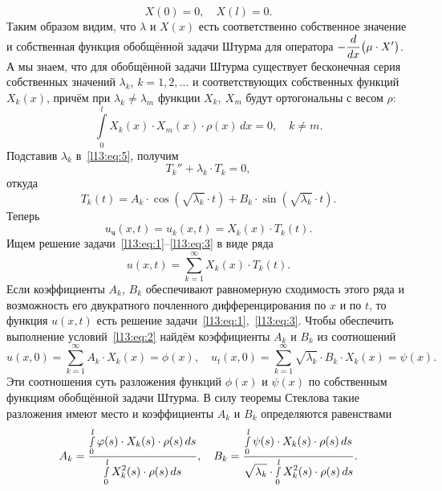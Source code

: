 \begin{equation}\label{l13:eq:7}
	 X(0)=0,\quad X(l)=0.
\end{equation}
Таким образом видим, что $\lambda$ и $X(x)$ есть соответственно собственное значение и собственная функция обобщённой задачи Штурма для оператора $\displaystyle-\der{}{x}\big(\mu\cdot X'\big)$. А мы знаем, что для обобщённой задачи Штурма существует бесконечная серия собственных значений $\lambda_k$, $k=1,2,\ldots$ и соответствующих собственных функций $X_k(x)$, причём при $\lambda_k\neq\lambda_m$ функции $X_k,\ X_m$ будут ортогональны с весом $\rho$:
\begin{equation*}
	\int\limits_0^l X_k(x)\cdot X_m(x)\cdot\rho(x)\,dx=0,\quad k\neq m.
\end{equation*}
Подставив $\lambda_k$ в~\eqref{l13:eq:5}, получим
\begin{equation*}
	 T_k''+\lambda_k\cdot T_k=0,
\end{equation*}
откуда 
\begin{equation*}
	 T_k(t)=A_k\cdot\cos\left(\sqrt{\lambda_k}\cdot t\right)+B_k\cdot\sin\left(\sqrt{\lambda_k}\cdot t\right).
\end{equation*}
Теперь 
\begin{equation*}
	 u_{\text{ч}}(x,t)=u_k(x,t)=X_k(x)\cdot T_k(t).
\end{equation*}
Ищем решение задачи~\eqref{l13:eq:1}--\eqref{l13:eq:3} в виде ряда
\begin{equation*}
	 u(x,t)=\sum\limits_{k=1}^{\infty}X_k(x)\cdot T_k(t).
\end{equation*}
Если коэффициенты $A_k$, $B_k$ обеспечивают равномерную сходимость этого ряда и возможность его двукратного почленного дифференцирования по $x$ и по $t$, то функция $u(x,t)$ есть решение задачи~\eqref{l13:eq:1},~\eqref{l13:eq:3}. Чтобы обеспечить выполнение условий~\eqref{l13:eq:2} найдём коэффициенты $A_k$ и $B_k$ из соотношений 
\begin{equation*}
	 u(x,0)=\sum\limits_{k=1}^{\infty}A_k\cdot X_k(x)=\phi(x),\quad\!\! u_t(x,0)=\sum\limits_{k=1}^{\infty}\sqrt{\lambda_k}\cdot B_k\cdot X_k(x)=\psi(x). 
\end{equation*}
Эти соотношения суть разложения функций $\phi(x)$ и $\psi(x)$ по собственным функциям обобщённой задачи Штурма. В силу теоремы Стеклова такие разложения имеют место и коэффициенты $A_k$ и $B_k$ определяются равенствами
\begin{equation*}
	 A_k=\frac{\displaystyle\smallint\limits_0^l\phi(s)\cdot X_k(s)\cdot\rho(s)\,ds}{\displaystyle\smallint\limits_0^l X^2_k(s)\cdot\rho(s)\,ds},\quad B_k=\frac{\displaystyle\smallint\limits_0^l\psi(s)\cdot X_k(s)\cdot\rho(s)\,ds}{\displaystyle\sqrt{\lambda_k}\cdot\smallint\limits_0^l X^2_k(s)\cdot\rho(s)\,ds}.
\end{equation*}
